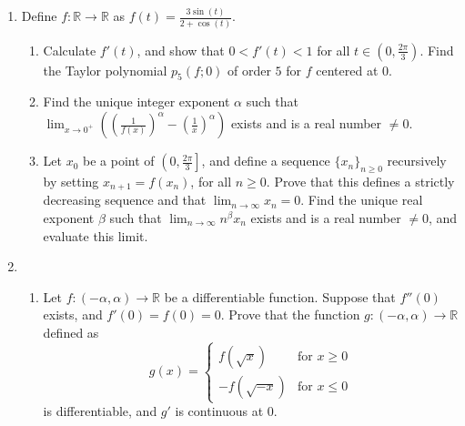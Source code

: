 \documentclass[11pt]{article}
\newcommand{\R}{\mathbb{R}}
\begin{document}
  \begin{enumerate}
    \item  Define \(f \colon \R \to \R\) as \(f(t) = \displaystyle\frac{3\sin(t)}{2 + \cos(t)}\).
      \begin{enumerate}
        \item Calculate \(f'(t)\), and show that \(0 < f'(t) < 1\) for all \(t \in \left(0, \frac{2\pi}{3}\right)\). 
          Find the Taylor polynomial \(p_5(f; 0)\) of order \(5\) for \(f\) centered at \(0\).

        \item Find the unique integer exponent \(\alpha\) such that \(\displaystyle\lim_{x \to 0^+} 
          \left( \left(\frac{1}{f(x)}\right)^\alpha - \left(\frac{1}{x}\right)^\alpha\right)\) exists and is a real 
          number \(\neq 0\).

        \item Let \(x_0\) be a point of \(\left(0, \frac{2\pi}{3}\right]\), and define a sequence \(\{x_n\}_{n \geq 0}\) 
          recursively by setting \(x_{n+1} = f(x_n)\), for all \(n \geq 0\).  Prove that this defines a strictly 
          decreasing sequence and that \(\displaystyle\lim_{n \to \infty} x_n = 0\).  Find the unique real exponent 
          \(\beta\) such that \(\displaystyle\lim_{n \to \infty} n^\beta x_n\) exists and is a real number \(\neq 0\), 
          and evaluate this limit.
      \end{enumerate}
      \newpage

    \item \begin{enumerate}
        \item Let \(f \colon (-\alpha, \alpha) \to \R\) be a differentiable function.  Suppose that \(f''(0)\) exists, 
          and \(f'(0) = f(0) = 0\).  Prove that the function \(g \colon (-\alpha, \alpha) \to \R\) defined as
          \[
            g(x) = \begin{cases}
              f(\sqrt{x}) & \text{for } x \geq 0 \\
              -f(\sqrt{-x}) & \text{for } x \leq 0
            \end{cases}
          \]
          is differentiable, and \(g'\) is continuous at \(0\).


\end{enumerate}
\end{enumerate}
\end{document}
